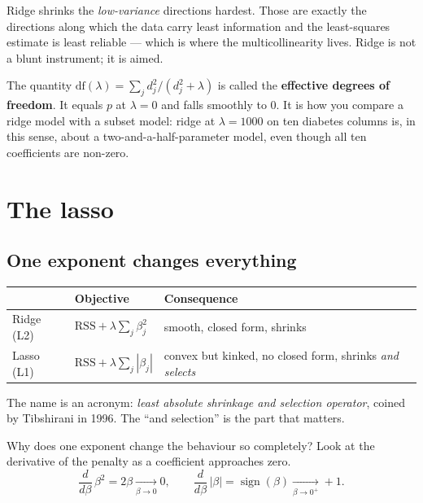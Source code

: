 \documentclass[11pt]{article}
\begin{document}
\begin{keyidea}
Ridge shrinks the \emph{low-variance} directions hardest. Those are exactly
the directions along which the data carry least information and the
least-squares estimate is least reliable --- which is where the
multicollinearity lives. Ridge is not a blunt instrument; it is aimed.
\end{keyidea}

The quantity $\mathrm{df}(\lambda) = \sum_j d_j^2/(d_j^2+\lambda)$ is called
the \textbf{effective degrees of freedom}. It equals $p$ at $\lambda = 0$ and
falls smoothly to $0$. It is how you compare a ridge model with a subset
model: ridge at $\lambda = 1000$ on ten diabetes columns is, in this sense,
about a two-and-a-half-parameter model, even though all ten coefficients are
non-zero.

\section{The lasso}
\label{sec:lasso}

\subsection{One exponent changes everything}

\begin{center}
\begin{tabular}{@{}lll@{}}
\toprule
& \textbf{Objective} & \textbf{Consequence}\\
\midrule
Ridge (L2) & $\text{RSS} + \lambda\sum_j \beta_j^2$
  & smooth, closed form, shrinks\\
Lasso (L1) & $\text{RSS} + \lambda\sum_j |\beta_j|$
  & convex but kinked, no closed form, shrinks \emph{and selects}\\
\bottomrule
\end{tabular}
\end{center}

The name is an acronym: \emph{least absolute shrinkage and selection
operator}, coined by Tibshirani in 1996. The ``and selection'' is the part
that matters.

Why does one exponent change the behaviour so completely? Look at the
derivative of the penalty as a coefficient approaches zero.
\[
  \frac{d}{d\beta}\,\beta^2 = 2\beta \xrightarrow[\beta \to 0]{} 0,
  \qquad
  \frac{d}{d\beta}\,|\beta| = \operatorname{sign}(\beta)
  \xrightarrow[\beta \to 0^{+}]{} +1 .
\]
\end{document}
